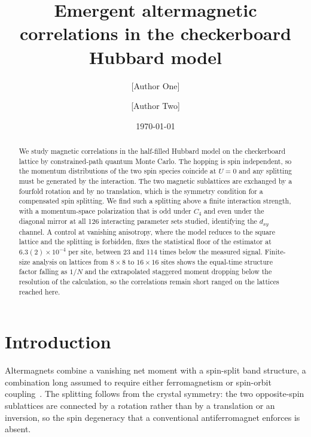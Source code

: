 \documentclass[aps,prb,reprint,superscriptaddress,amsmath,amssymb,floatfix]{revtex4-2}
\begin{document}
\title{Emergent altermagnetic correlations in the checkerboard Hubbard model}

\author{[Author One]}
\affiliation{[Affiliation]}
\author{[Author Two]}
\affiliation{[Affiliation]}

\date{\today}

\begin{abstract}
We study magnetic correlations in the half-filled Hubbard model on the
checkerboard lattice by constrained-path quantum Monte Carlo. The hopping is
spin independent, so the momentum distributions of the two spin species coincide
at $U=0$ and any splitting must be generated by the interaction. The two
magnetic sublattices are exchanged by a fourfold rotation and by no translation,
which is the symmetry condition for a compensated spin splitting. We find such a
splitting above a finite interaction strength, with a momentum-space
polarization that is odd under $C_4$ and even under the diagonal mirror at all
126 interacting parameter sets studied, identifying the $d_{xy}$ channel. A
control at vanishing anisotropy, where the model reduces to the square lattice
and the splitting is forbidden, fixes the statistical floor of the estimator at
$6.3(2)\times10^{-4}$ per site, between 23 and 114 times below the measured
signal. Finite-size analysis on lattices from $8\times8$ to $16\times16$ sites
shows the equal-time structure factor falling as $1/N$ and the extrapolated
staggered moment dropping below the resolution of the calculation, so the
correlations remain short ranged on the lattices reached here.
\end{abstract}

\maketitle


\section{Introduction}

Altermagnets combine a vanishing net moment with a spin-split band structure,
a combination long assumed to require either ferromagnetism or spin-orbit
coupling~\cite{Smejkal2022a,Smejkal2022b}. The splitting follows from the
crystal symmetry: the two opposite-spin sublattices are connected by a rotation
rather than by a translation or an inversion, so the spin degeneracy that a
conventional antiferromagnet enforces is absent.
\end{document}
